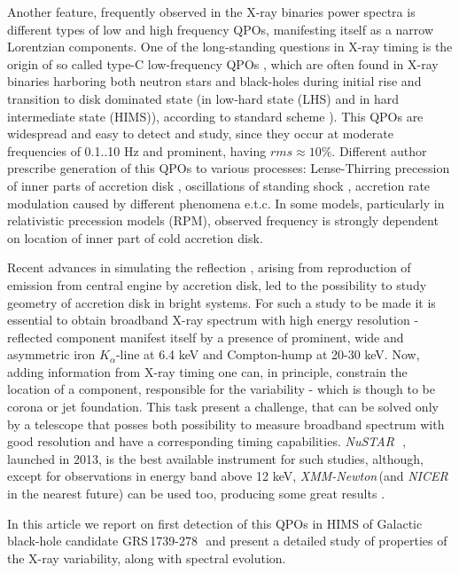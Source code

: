 \documentclass[a4paper,fleqn,usenatbib]{mnras}
\def\grs{{GRS\,1739-278\,}}
\def\xmm{{\em XMM-Newton\,}}
\def\nustar{{\em NuSTAR\,}}
\begin{document}
Another feature, frequently observed in the X-ray binaries power spectra is different types of low and high frequency QPOs, manifesting itself as a narrow Lorentzian components. One of the long-standing questions in X-ray timing is the origin of so called type-C low-frequency QPOs \citep[see][for LFQPO classification]{casella05}, which are often found in X-ray binaries harboring both neutron stars and black-holes \citep{wijnands99} during initial rise and transition to disk dominated state (in low-hard state (LHS) and in hard intermediate state (HIMS)), according to standard scheme \citep{grebenev97, tanaka96, remillard06, belloni10}). This QPOs are widespread and easy to detect and study, since they occur at moderate frequencies of 0.1..10 Hz and prominent, having $rms\approx10\%$. Different author prescribe generation of this QPOs to various processes: Lense-Thirring precession of inner parts of accretion disk \citep{stella98, ingram09}, oscillations of standing shock \citep{molteni96}, accretion rate modulation caused by different phenomena \citep{tagger99,cabanac10} e.t.c. In some models, particularly in relativistic precession models (RPM), observed frequency is strongly dependent on location of inner part of cold accretion disk.  

Recent advances in simulating the reflection \citep{ross05,garcia14}, arising from reproduction of emission from central engine by accretion disk, led to the possibility to study geometry of accretion disk in bright systems. For such a study to be made it is essential to obtain broadband X-ray spectrum with high energy resolution - reflected component manifest itself by a presence of prominent, wide and asymmetric iron $K_{\alpha}$-line at 6.4 keV and Compton-hump at 20-30 keV. Now, adding information from X-ray timing one can, in principle, constrain the location of a component, responsible for the variability - which is though to be corona or jet foundation. This task present a challenge, that can be solved only by a telescope that posses both possibility to measure broadband spectrum with good resolution and have a corresponding timing capabilities. \nustar\, \citep{harrison13_nust}, launched in 2013, is the best available instrument for such studies, although, except for observations in energy band above 12 keV, \xmm (and {\it NICER} in the nearest future) can be used too, producing some great results \citep{ingram16}. 

In this article we report on first detection of this QPOs in HIMS of Galactic black-hole candidate \grs\, and present a detailed study of properties of the X-ray variability, along with spectral evolution.
\end{document}
